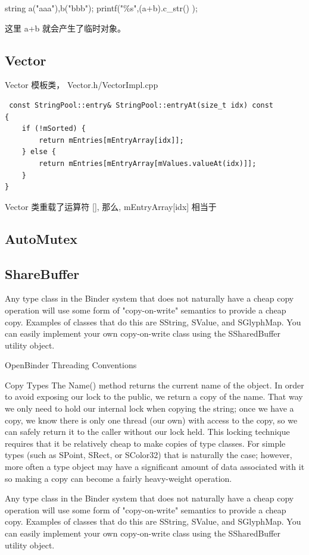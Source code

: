 \documentclass[a4paper,11pt]{article}
\begin{document}
 string a("aaa"),b("bbb");
 printf("\%s",(a+b).c_str() );

 这里 a+b 就会产生了临时对象。



\subsection{Vector}
Vector 模板类， Vector.h/VectorImpl.cpp
\begin{lstlisting}
 const StringPool::entry& StringPool::entryAt(size_t idx) const
{
    if (!mSorted) {
        return mEntries[mEntryArray[idx]];
    } else {
        return mEntries[mEntryArray[mValues.valueAt(idx)]];
    }
}
\end{lstlisting}

Vector 类重载了运算符 [], 那么,  mEntryArray[idx] 相当于

\subsection{AutoMutex}

\subsection{ShareBuffer}
Any type class in the Binder system that does not naturally have a cheap copy operation will use some form of "copy-on-write" semantics to provide a cheap copy. Examples of classes that do this are SString, SValue, and SGlyphMap. You can easily implement your own copy-on-write class using the SSharedBuffer utility object.

OpenBinder
Threading Conventions


Copy Types
The Name() method returns the current name of the object. In order to avoid exposing our lock to the public, we return a copy of the name. That way we only need to hold our internal lock when copying the string; once we have a copy, we know there is only one thread (our own) with access to the copy, so we can safely return it to the caller without our lock held.
This locking technique requires that it be relatively cheap to make copies of type classes. For simple types (such as SPoint, SRect, or SColor32) that is naturally the case; however, more often a type object may have a significant amount of data associated with it so making a copy can become a fairly heavy-weight operation.

Any type class in the Binder system that does not naturally have a cheap copy operation will use some form of "copy-on-write" semantics to provide a cheap copy. Examples of classes that do this are SString, SValue, and SGlyphMap. You can easily implement your own copy-on-write class using the SSharedBuffer utility object.
\end{document}
